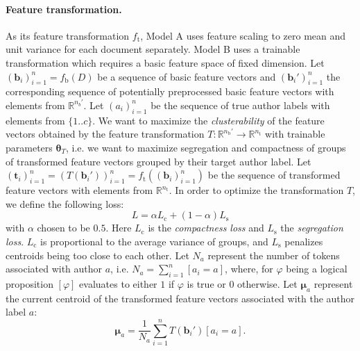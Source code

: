 \documentclass[10pt, a4paper]{article}
\newcommand{\vect}[1]{\bm{#1}}
\begin{document}
\paragraph{Feature transformation.}
As its feature transformation $f_\mathrm{t}$, Model A uses feature scaling to zero mean and unit variance for each document separately. Model B uses a trainable transformation which requires a basic feature space of fixed dimension. Let $(\vect{b}_i)_{i=1}^n = f_\mathrm{b}(D)$ be a sequence of basic feature vectors and $(\vect{b}_i')_{i=1}^n$ the corresponding sequence of potentially preprocessed basic feature vectors with elements from $\mathbb{R}^{n_{b}'}$. Let $(a_i)_{i=1}^n$ be the sequence of true author labels with elements from $\{1..c\}$. We want to maximize the \emph{clusterability} of the feature vectors obtained by the feature transformation $T:\mathbb{R}^{n_\mathrm{b}'}\rightarrow\mathbb{R}^{n_\mathrm{t}}$ with trainable parameters $\vect{\theta}_T$, i.e. we want to maximize segregation and compactness of groups of transformed feature vectors grouped by their target author label. Let $(\vect{t}_i)_{i=1}^n = (T(\boldsymbol{b}_i'))_{i=1}^n = f_\mathrm{t}((\vect{b}_i)_{i=1}^n)$ be the sequence of transformed feature vectors with elements from $\mathbb{R}^{n_\mathrm{t}}$. In order to optimize the transformation $T$, we define the following loss:
\begin{equation}
	L = \alpha L_\mathrm{c} + (1-\alpha)L_\mathrm{s}
\end{equation}
with $\alpha$ chosen to be $0.5$. Here $L_\mathrm{c}$ is the \emph{compactness loss} and $L_\mathrm{s}$ the \emph{segregation loss}. $L_\mathrm{c}$ is proportional to the average variance of groups, and $L_\mathrm{s}$ penalizes centroids being too close to each other. Let $N_a$ represent the number of tokens associated with author $a$, i.e. $N_a = \sum_{i=1}^n[a_i=a]$, where, for $\varphi$ being a logical proposition $[\varphi]$ evaluates to either $1$ if $\varphi$ is true or $0$ otherwise.
Let $\vect{\mu}_a$ represent the current centroid of the transformed feature vectors associated with the author label $a$:
\begin{equation}
\vect{\mu}_a = \frac{1}{N_a}\sum_{i=1}^n T(\vect{b}_i')[a_i=a].
\end{equation}	
\end{document}
